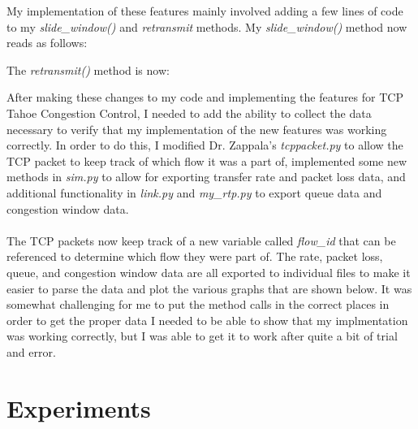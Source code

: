 \documentclass[11pt]{article}
\begin{document}
My implementation of these features mainly involved adding a few lines of code to my \textit{slide\_window()} and \textit{retransmit} methods. My \textit{slide\_window()} method now reads as follows:


\vspace{0.25cm}
The \textit{retransmit()} method is now:

\vspace{0.25cm}

After making these changes to my code and implementing the features for TCP Tahoe Congestion Control, I needed to add the ability to collect the data necessary to verify that my implementation of the new features was working correctly. In order to do this, I modified Dr. Zappala's \textit{tcppacket.py} to allow the TCP packet to keep track of which flow it was a part of, implemented some new methods in \textit{sim.py} to allow for exporting transfer rate and packet loss data, and additional functionality in \textit{link.py} and \textit{my\_rtp.py} to export queue data and congestion window data.\\
\\
The TCP packets now keep track of a new variable called \textit{flow\_id} that can be referenced to determine which flow they were part of. The rate, packet loss, queue, and congestion window data are all exported to individual files to make it easier to parse the data and plot the various graphs that are shown below. It was somewhat challenging for me to put the method calls in the correct places in order to get the proper data I needed to be able to show that my implmentation was working correctly, but I was able to get it to work after quite a bit of trial and error.
\vspace{0.25cm}

\section{Experiments}
\end{document}
